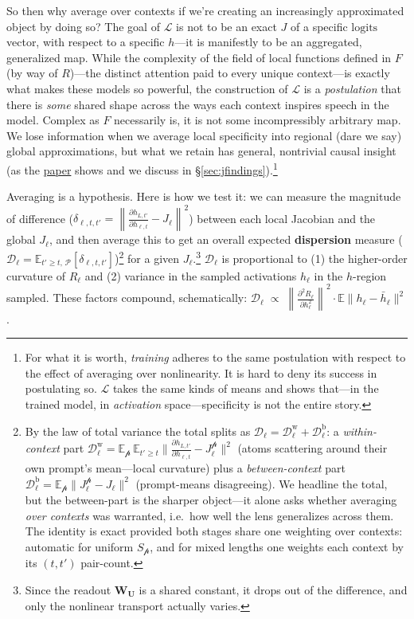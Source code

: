 \documentclass{article}
\newcommand{\logits}{\mathrm{logits}}
\newcommand{\jlens}{\mathscr{L}}
\newcommand{\dispersion}{\mathscr{D}}
\begin{document}
So then why average over contexts if we're creating an increasingly approximated object by doing so? The goal of \(\jlens\) is not to be an exact \(J\) of a specific \(\logits\) vector, with respect to a specific \(h\)---it is manifestly to be an aggregated, generalized map. While the complexity of the field of local functions defined in \(F\) (by way of \(R\))---the distinct attention paid to every unique context---is exactly what makes these models so powerful, the construction of \(\jlens\) is a \textit{postulation} that there is \textit{some} shared shape across the ways each context inspires speech in the model. Complex as \(F\) necessarily is, it is not some incompressibly arbitrary map. We lose information when we average local specificity into regional (dare we say) global approximations, but what we retain has general, nontrivial causal insight (as the \href{https://transformer-circuits.pub/2026/workspace/index.html}{paper} shows and we discuss in \S\ref{sec:jfindings}).\footnote{For what it is worth, \textit{training} adheres to the same postulation with respect to the effect of averaging over nonlinearity. It is hard to deny its success in postulating so. \(\jlens\) takes the same kinds of means and shows that---in the trained model, in \textit{activation} space---specificity is not the entire story.}

Averaging is a hypothesis. Here is how we test it: we can measure the magnitude of difference (\(\delta_{\ell,t,t'} = \left\|\frac{\partial h_{L,t'}}{\partial h_{\ell,t}} - J_\ell\right\|^2\)) between each local Jacobian and the global \(J_\ell\), and then average this to get an overall expected \textbf{dispersion} measure (\(\dispersion_\ell = \mathbb{E}_{t' \ge t,\, \mathscr{P}}[\delta_{\ell,t,t'}]\))\footnote{By the law of total variance the total splits as \(\dispersion_\ell = \dispersion^{\mathrm{w}}_\ell + \dispersion^{\mathrm{b}}_\ell\): a \textit{within-context} part \(\dispersion^{\mathrm{w}}_\ell = \mathbb{E}_{\mathscr{p}}\,\mathbb{E}_{t'\ge t}\bigl\lVert\frac{\partial h_{L,t'}}{\partial h_{\ell,t}} - J^{\mathscr{p}}_\ell\bigr\rVert^2\) (atoms scattering around their own prompt's mean---local curvature) plus a \textit{between-context} part \(\dispersion^{\mathrm{b}}_\ell = \mathbb{E}_{\mathscr{p}}\bigl\lVert J^{\mathscr{p}}_\ell - J_\ell\bigr\rVert^2\) (prompt-means disagreeing). We headline the total, but the between-part is the sharper object---it alone asks whether averaging \textit{over contexts} was warranted, i.e.\ how well the lens generalizes across them. The identity is exact provided both stages share one weighting over contexts: automatic for uniform \(S_{\mathscr{p}}\), and for mixed lengths one weights each context by its \((t,t')\) pair-count.} for a given \(J_\ell\).\footnote{Since the readout \(\mathbf{W_U}\) is a shared constant, it drops out of the difference, and only the nonlinear transport actually varies.} \(\dispersion_\ell\) is proportional to (1) the higher-order curvature of \(R_{\ell}\) and (2) variance in the sampled activations \(h_\ell\) in the \(h\)-region sampled. These factors compound, schematically: \(\dispersion_\ell \;\propto\; \left\|\frac{\partial^2 R_\ell}{\partial h_\ell^2}\right\|^2 \cdot \mathbb{E}\|h_\ell-\bar h_\ell\|^2\).
\end{document}
